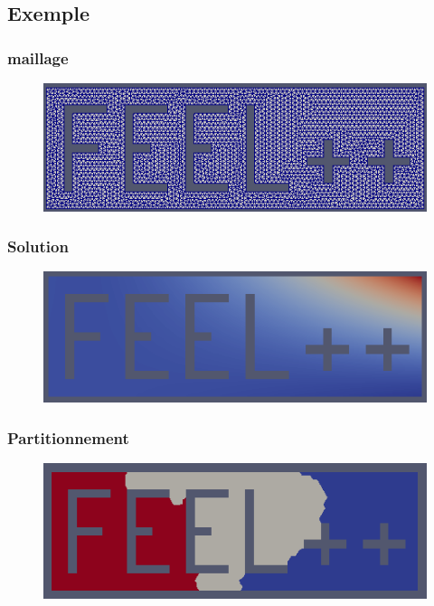 \documentclass{beamer}
\begin{document}
\subsection{Exemple}
\begin{frame}
\frametitle{maillage}
\begin{figure}
\includegraphics [width=\textwidth] {maillage.png}
\end{figure}
\end{frame}
\begin{frame}
\frametitle{Solution}
\begin{figure}
\includegraphics [width=\textwidth] {Feel1.png}
\end{figure}
\end{frame}
\begin{frame}
\frametitle{Partitionnement}
\begin{figure}
\includegraphics [width=\textwidth] {Feel3.png}
\end{figure}
\end{frame}
\end{document}
